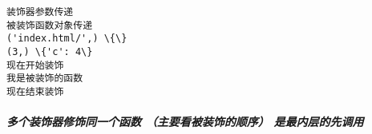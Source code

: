\documentclass[11pt]{article}
\begin{document}
    \begin{Verbatim}[commandchars=\\\{\}]
装饰器参数传递
被装饰函数对象传递
('index.html/',) \{\}
(3,) \{'c': 4\}
现在开始装饰
我是被装饰的函数
现在结束装饰

    \end{Verbatim}

    \hypertarget{ux591aux4e2aux88c5ux9970ux5668ux4feeux9970ux540cux4e00ux4e2aux51fdux6570-ux4e3bux8981ux770bux88abux88c5ux9970ux7684ux987aux5e8f-ux662fux6700ux5185ux5c42ux7684ux5148ux8c03ux7528}{%
\subparagraph{多个装饰器修饰同一个函数 （主要看被装饰的顺序）
是最内层的先调用}\label{ux591aux4e2aux88c5ux9970ux5668ux4feeux9970ux540cux4e00ux4e2aux51fdux6570-ux4e3bux8981ux770bux88abux88c5ux9970ux7684ux987aux5e8f-ux662fux6700ux5185ux5c42ux7684ux5148ux8c03ux7528}}
\end{document}
